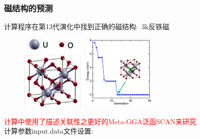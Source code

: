 \documentclass[cjk,slidestop,compress,mathserif,blue]{beamer}
\begin{document}
\frame
{
	\frametitle{\textrm{}磁结构的预测}
	计算程序在第13代演化中找到\textrm{}正确的磁结构:~\textrm{3k}反铁磁
\begin{figure}[h!]
\vspace*{-0.08in}
\centering
\includegraphics[height=1.45in,width=1.20in]{Figures/UO2-struct.png}
\hskip 0.5pt
\includegraphics[height=1.45in,width=1.50in]{Figures/UO2-Generation.png}
\label{Fig:FeSe-Generation}
\end{figure}
\textcolor{red}{\tiny{计算中使用了描述关联性之更好的\textrm{Meta-GGA}泛函\textrm{SCAN}来研究\textrm{}}}\\
\vskip 0.08in
\centering
计算参数\textrm{input.data}文件设置:\\
}
\appendix
\end{document}
